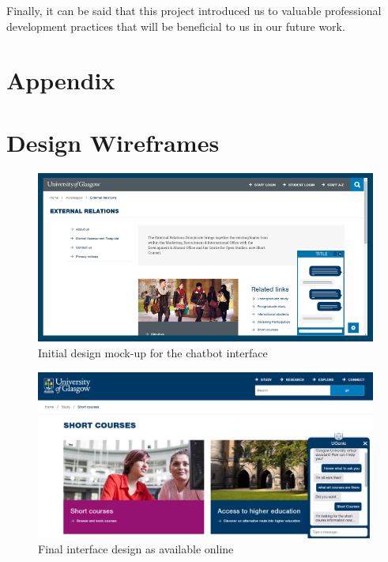 \documentclass{l3proj}
\begin{document}
Finally, it can be said that this project introduced us to valuable professional development practices that will be beneficial to us in our future work.


\clearpage



\bigskip
\bigskip

\section*{Appendix}
\appendix
\section{Design Wireframes}
\label{apdx:wireframes}

\begin{figure}[h!]
    \centering
    \includegraphics[width=0.85\linewidth]{figures/wireframe-background.png}
    \caption{Initial design mock-up for the chatbot interface}
\end{figure}

\begin{figure}[h!]
    \centering
    \includegraphics[width=0.85\linewidth]{figures/final-image.PNG}
    \caption{Final interface design as available online}
\end{figure}
\end{document}
